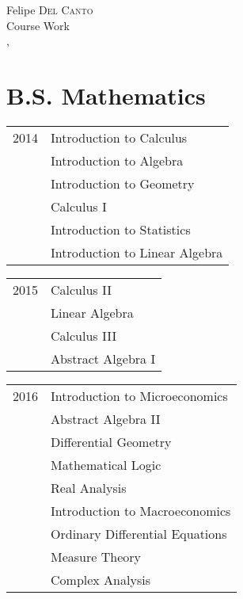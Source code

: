 \documentclass[a4paper,10pt]{article}
\begin{document}
\pagestyle{empty} %


\par{\centering
		{{\Huge Felipe \textsc{Del Canto}}	\\
		{\LARGE Course Work}	\\\smallskip
		 {\large \monthname, \the\year }
	}\par}

\section{B.S. Mathematics}

\begin{tabular}{r|p{11cm}}
\textsc{2014}
 	&	Introduction to Calculus	\\
 	&	Introduction to Algebra	\\
 	&	Introduction to Geometry	\\
 	&	Calculus I	\\
 	&	Introduction to Statistics	\\
 	&	Introduction to Linear Algebra
\end{tabular}

\begin{tabular}{r|p{11cm}}
\textsc{2015}
 	&	Calculus II	\\
 	&	Linear Algebra	\\
	&	Calculus III	\\
	&	Abstract Algebra I	\\
\end{tabular}

\begin{tabular}{r|p{11cm}}
\textsc{2016}
 	&	Introduction to Microeconomics	\\
 	&	Abstract Algebra II	\\
	&	Differential Geometry	\\
	&	Mathematical Logic	\\
	&	Real Analysis	\\
	&	Introduction to Macroeconomics	\\
	&	Ordinary Differential Equations	\\
	&	Measure Theory	\\
	&	Complex Analysis	\\
\end{tabular}
\end{document}
